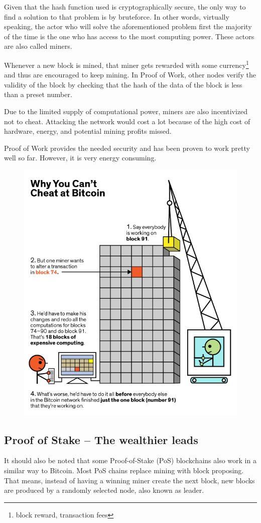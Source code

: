 \documentclass[a4paper]{article}
\begin{document}
	Given that the hash function used is cryptographically secure, the only way to find a solution to that problem is by bruteforce. In other words, virtually speaking, the actor who will solve the aforementioned problem first the majority of the time is the one who has access to the most computing power. These actors are also called miners.
	
	Whenever a new block is mined, that miner gets rewarded with some currency\footnote{block reward, transaction fees} and thus are encouraged to keep mining. In Proof of Work, other nodes verify the validity of the block by checking that the hash of the data of the block is less than a preset number.\cite{bcdifficulty}
	
	Due to the limited supply of computational power, miners are also incentivized not to cheat. Attacking the network would cost a lot because of the high cost of hardware, energy, and potential mining profits missed.
	
	Proof of Work provides the needed security and has been proven to work pretty well so far. However, it is very energy consuming.
	\begin{figure}[H]
		\centering
		\includegraphics[width=0.8\linewidth]{3.png}
	\end{figure}
	
	\subsection{Proof of Stake -- The wealthier leads}
	It should also be noted that some Proof-of-Stake (PoS) blockchains also work in a similar way to Bitcoin. Most PoS chains replace mining with block proposing. That means, instead of having a winning miner create the next block, new blocks are produced by a randomly selected node, also known as leader.
	
\end{document}
